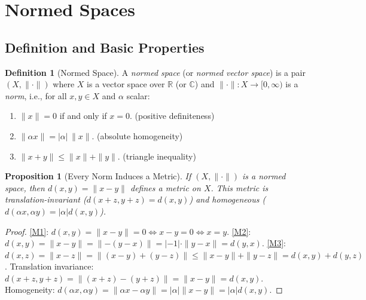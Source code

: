 \documentclass[11pt,a4paper]{article}
\theoremstyle{definition}
\newtheorem{definition}{Definition}[section]
\theoremstyle{plain}
\newtheorem{proposition}[theorem]{Proposition}
\theoremstyle{remark}
\newcommand{\R}{\mathbb{R}}
\newcommand{\C}{\mathbb{C}}
\begin{document}
\section{Normed Spaces}
\label{sec:normed}

\subsection{Definition and Basic Properties}
\label{subsec:norm_def}

\begin{definition}[Normed Space]
\label{def:normed}
A \emph{normed space} (or \emph{normed vector space}) is a pair $(X, \|\cdot\|)$
where $X$ is a vector space over $\R$ (or $\C$) and
$\|\cdot\| \colon X \to [0,\infty)$ is a \emph{norm}, i.e., for all
$x, y \in X$ and $\alpha$ scalar:
\begin{enumerate}[nosep,label=(N\arabic*)]
    \item \label{N1} $\|x\| = 0$ if and only if $x = 0$.
    \hfill(positive definiteness)
    \item \label{N2} $\|\alpha x\| = |\alpha| \, \|x\|$.
    \hfill(absolute homogeneity)
    \item \label{N3} $\|x + y\| \le \|x\| + \|y\|$.
    \hfill(triangle inequality)
\end{enumerate}
\end{definition}

\begin{proposition}[Every Norm Induces a Metric]
\label{prop:norm_metric}
If $(X, \|\cdot\|)$ is a normed space, then $d(x,y) = \|x - y\|$ defines a metric
on $X$. This metric is \emph{translation-invariant} ($d(x+z, y+z) = d(x,y)$) and
\emph{homogeneous} ($d(\alpha x, \alpha y) = |\alpha| d(x,y)$).
\end{proposition}

\begin{proof}
\ref{M1}: $d(x,y) = \|x - y\| = 0 \iff x - y = 0 \iff x = y$.
\ref{M2}: $d(x,y) = \|x - y\| = \|{-(y-x)}\| = |{-1}| \cdot \|y - x\| = d(y,x)$.
\ref{M3}: $d(x,z) = \|x - z\| = \|(x-y)+(y-z)\| \le \|x-y\| + \|y-z\| = d(x,y) + d(y,z)$.
Translation invariance: $d(x+z, y+z) = \|(x+z)-(y+z)\| = \|x-y\| = d(x,y)$.
Homogeneity: $d(\alpha x, \alpha y) = \|\alpha x - \alpha y\| = |\alpha| \|x - y\| = |\alpha| d(x,y)$.
\end{proof}
\end{document}
